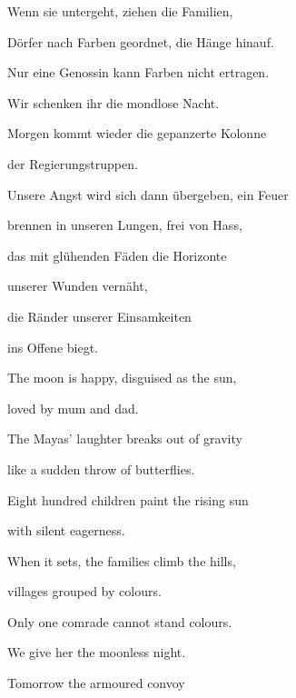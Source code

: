 \documentclass[a4paper]{article}
\begin{document}
\bigskip

Wenn sie untergeht, ziehen die Familien,

Dörfer nach Farben geordnet, die Hänge hinauf.


\bigskip

Nur eine Genossin kann Farben nicht ertragen. 

Wir schenken ihr die mondlose Nacht.


\bigskip

Morgen kommt wieder die gepanzerte Kolonne

der Regierungstruppen.


\bigskip

Unsere Angst wird sich dann übergeben, ein Feuer

brennen in unseren Lungen, frei von Hass,


\bigskip

das mit glühenden Fäden die Horizonte 

unserer Wunden vernäht,


\bigskip

die Ränder unserer Einsamkeiten 

ins Offene biegt.


\bigskip


\bigskip


\bigskip


\bigskip



\bigskip

The moon is happy, disguised as the sun,

loved by mum and dad.


\bigskip

The Mayas' laughter breaks out of gravity

like a sudden throw of butterflies.


\bigskip

Eight hundred children paint the rising sun

with silent eagerness.


\bigskip

When it sets, the families climb the hills,

villages grouped by colours.


\bigskip

Only one comrade cannot stand colours.

We give her the moonless night.


\bigskip

Tomorrow the armoured convoy
\end{document}
